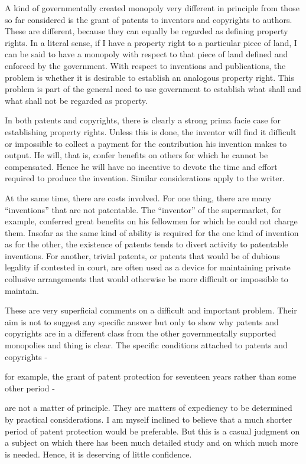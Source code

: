 \documentclass[11pt,openany]{book}
\begin{document}
A kind of governmentally created monopoly very different in principle from those so far considered is the grant of patents to inventors and copyrights to authors. These are different, because they can equally be regarded as defining property rights. In a literal sense, if I have a property right to a particular piece of land, I can be said to have a monopoly with respect to that piece of land defined and enforced by the government. With respect to inventions and publications, the problem is whether it is desirable to establish an analogous property right. This problem is part of the general need to use government to establish what shall and what shall not be regarded as property.

In both patents and copyrights, there is clearly a strong prima facie case for establishing property rights. Unless this is done, the inventor will find it difficult or impossible to collect a payment for the contribution his invention makes to output. He will, that is, confer benefits on others for which he cannot be compensated. Hence he will have no incentive to devote the time and effort required to produce the invention. Similar considerations apply to the writer.

At the same time, there are costs involved. For one thing, there are many ``inventions'' that are not patentable. The ``inventor'' of the supermarket, for example, conferred great benefits on his fellowmen for which he could not charge them. Insofar as the same kind of ability is required for the one kind of invention as for the other, the existence of patents tends to divert activity to patentable inventions. For another, trivial patents, or patents that would be of dubious legality if contested in court, are often used as a device for maintaining private collusive arrangements that would otherwise be more difficult or impossible to maintain.

These are very superficial comments on a difficult and important problem. Their aim is not to suggest any specific answer but only to show why patents and copyrights are in a different class from the other governmentally supported monopolies and thing is clear. The specific conditions attached to patents and copyrights -

for example, the grant of patent protection for seventeen years rather than some other period -

are not a matter of principle. They are matters of expediency to be determined by practical considerations. I am myself inclined to believe that a much shorter period of patent protection would be preferable. But this is a casual judgment on a subject on which there has been much detailed study and on which much more is needed. Hence, it is deserving of little confidence.
\end{document}

